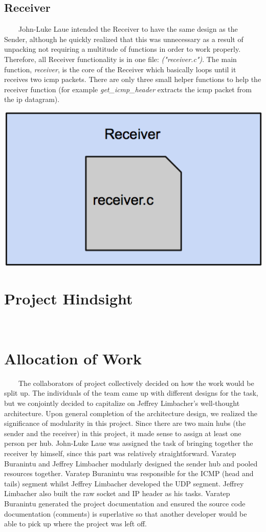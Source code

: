 \documentclass[11pt]{article}
\begin{document}
\subsection{Receiver}
\ \ \ \ John-Luke Laue intended the Receiver to have the same design as the Sender, although he quickly realized that this was unnecessary as a result of unpacking not requiring a multitude of functions in order to work properly. Therefore, all Receiver functionality is in one file: \textit{("receiver.c")}. The main function,  \textit{receiver}, is the core of the Receiver which basically loops until it receives two icmp packets. There are only three small helper functions to help the receiver function (for example \textit{get\_icmp\_header} extracts the icmp packet from the ip datagram).
\begin{center}
\includegraphics[scale=0.3]{images/receiver-design.png}
\end{center}

\section{Project Hindsight}
\ \ \ \ 

\section{Allocation of Work}
\ \ \ \ The collaborators of project collectively decided on how the work would be split up. The individuals of the team came up with different designs for the task, but we conjointly decided to capitalize on Jeffrey Limbacher's well-thought architecture. Upon general completion of the architecture design, we realized the significance of modularity in this project. Since there are two main hubs (the sender and the receiver) in this project, it made sense to assign at least one person per hub. John-Luke Laue was assigned the task of bringing together the receiver by himself, since this part was relatively straightforward. Varatep Buranintu and Jeffrey Limbacher modularly designed the sender hub and pooled resources together. Varatep Buranintu was responsible for the ICMP (head and tails) segment whilst Jeffrey Limbacher developed the UDP segment. Jeffrey Limbacher also built the raw socket and IP header as his tasks. Varatep Buranintu generated the project documentation and ensured the source code documentation (comments) is superlative so that another developer would be able to pick up where the project was left off.
\end{document}
